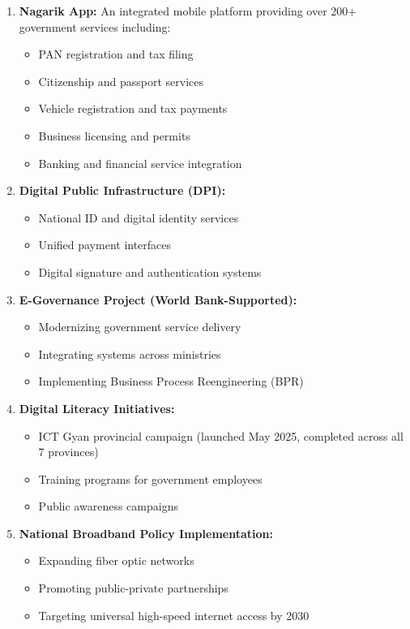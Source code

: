 \documentclass[12pt,a4paper]{article}
\begin{document}
\begin{enumerate}
    \item \textbf{Nagarik App:} An integrated mobile platform providing over 200+ government services including:
    \begin{itemize}
        \item PAN registration and tax filing
        \item Citizenship and passport services
        \item Vehicle registration and tax payments
        \item Business licensing and permits
        \item Banking and financial service integration
    \end{itemize}
    
    \item \textbf{Digital Public Infrastructure (DPI):}
    \begin{itemize}
        \item National ID and digital identity services
        \item Unified payment interfaces
        \item Digital signature and authentication systems
    \end{itemize}
    
    \item \textbf{E-Governance Project (World Bank-Supported):}
    \begin{itemize}
        \item Modernizing government service delivery
        \item Integrating systems across ministries
        \item Implementing Business Process Reengineering (BPR)
    \end{itemize}
    
    \item \textbf{Digital Literacy Initiatives:}
    \begin{itemize}
        \item ICT Gyan provincial campaign (launched May 2025, completed across all 7 provinces)
        \item Training programs for government employees
        \item Public awareness campaigns
    \end{itemize}
    
    \item \textbf{National Broadband Policy Implementation:}
    \begin{itemize}
        \item Expanding fiber optic networks
        \item Promoting public-private partnerships
        \item Targeting universal high-speed internet access by 2030
    \end{itemize}
\end{enumerate}
\end{document}

